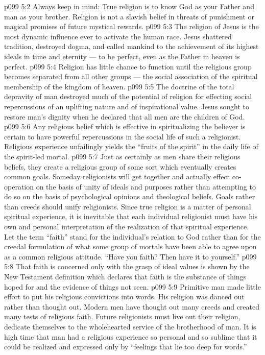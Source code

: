 \vs p099 5:2 Always keep in mind: True religion is to know God as your Father and man as your brother. Religion is not a slavish belief in threats of punishment or magical promises of future mystical rewards.
\vs p099 5:3 \pc The religion of Jesus is the most dynamic influence ever to activate the human race. Jesus shattered tradition, destroyed dogma, and called mankind to the achievement of its highest ideals in time and eternity --- to be perfect, even as the Father in heaven is perfect.
\vs p099 5:4 \pc Religion has little chance to function until the religious group becomes separated from all other groups --- the social association of the spiritual membership of the kingdom of heaven.
\vs p099 5:5 The doctrine of the total depravity of man destroyed much of the potential of religion for effecting social repercussions of an uplifting nature and of inspirational value. Jesus sought to restore man’s dignity when he declared that all men are the children of God.
\vs p099 5:6 Any religious belief which is effective in spiritualizing the believer is certain to have powerful repercussions in the social life of such a religionist. Religious experience unfailingly yields the “fruits of the spirit” in the daily life of the spirit\hyp{}led mortal.
\vs p099 5:7 Just as certainly as men share their religious beliefs, they create a religious group of some sort which eventually creates common goals. Someday religionists will get together and actually effect co\hyp{}operation on the basis of unity of ideals and purposes rather than attempting to do so on the basis of psychological opinions and theological beliefs. Goals rather than creeds should unify religionists. Since true religion is a matter of personal spiritual experience, it is inevitable that each individual religionist must have his own and personal interpretation of the realization of that spiritual experience. Let the term “faith” stand for the individual’s relation to God rather than for the creedal formulation of what some group of mortals have been able to agree upon as a common religious attitude. “Have you faith? Then have it to yourself.”
\vs p099 5:8 That faith is concerned only with the grasp of ideal values is shown by the New Testament definition which declares that faith is the substance of things hoped for and the evidence of things not seen.
\vs p099 5:9 Primitive man made little effort to put his religious convictions into words. His religion was danced out rather than thought out. Modern men have thought out many creeds and created many tests of religious faith. Future religionists must live out their religion, dedicate themselves to the wholehearted service of the brotherhood of man. It is high time that man had a religious experience so personal and so sublime that it could be realized and expressed only by “feelings that lie too deep for words.”
